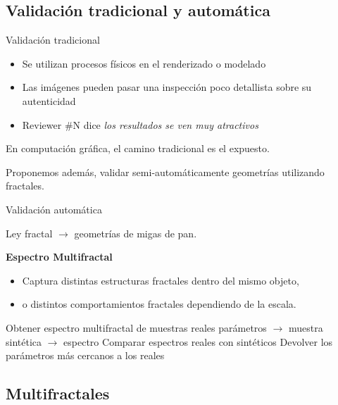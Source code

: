 \documentclass[spanish,unknownkeysallowed]{beamer}
\begin{document}
\subsection{Validación tradicional y automática}
\begin{frame}{Validación tradicional}
\begin{itemize}
\item Se utilizan procesos físicos en el renderizado o modelado
\item Las imágenes pueden pasar una inspección poco detallista sobre su autenticidad
\item Reviewer \#N dice \it{los resultados se ven muy atractivos}
\end{itemize}

En computación gráfica, el camino tradicional es el expuesto.

Proponemos además, validar semi-automáticamente geometrías utilizando fractales.

\end{frame}

\begin{frame}{Validación automática}

Ley fractal $\rightarrow$ geometrías de migas de pan.

\textbf{Espectro Multifractal}

\begin{itemize}
\item Captura distintas estructuras fractales dentro del mismo objeto,
\item o distintos comportamientos fractales dependiendo de la escala.
\end{itemize}

\begin{algorithm}[H]
\begin{algorithmic}[1]
\STATE Obtener espectro multifractal de muestras reales
\STATE parámetros $\rightarrow$ muestra sintética $\rightarrow$ espectro
\STATE Comparar espectros reales con sintéticos
\ENDFOR
\STATE Devolver los parámetros más cercanos a los reales
\end{algorithmic}
\end{algorithm}
\end{frame}


\subsection{Multifractales}
\end{document}
